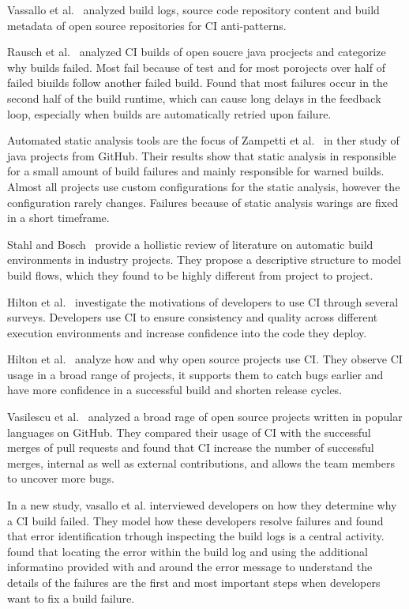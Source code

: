 \documentclass[\myrootdir/main.tex]{subfiles}
\begin{document}
Vassallo et al.~\cite{vassallo2019automated} analyzed build logs, source code repository content and build metadata of open source repositories for CI anti-patterns.

Rausch et al.~\cite{rausch2017empirical} analyzed CI builds of open soucre java procjects and categorize why builds failed.
Most fail because of test  and for most porojects over half of failed biuilds follow another failed build.
Found that most failures occur in the second half of the build runtime, which can cause long delays in the feedback loop, especially when builds are automatically retried upon failure.

Automated static analysis tools are the focus of Zampetti et al.~\cite{zampetti2017open} in ther study of java projects from GitHub.
Their results show that static analysis in responsible for a small amount of build failures and mainly responsible for warned builds.
Almost all projects use custom configurations for the static analysis, however the configuration rarely changes.
Failures because of static analysis warings are fixed in a short timeframe.

Stahl and Bosch~\cite{staahl2014modeling} provide a hollistic review of literature on automatic build environments in industry projects.
They propose a descriptive structure to model build flows, which they found to be highly different from project to project.

Hilton et al.~\cite{hilton2017trade-offs} investigate the motivations of developers to use CI through several surveys.
Developers use CI to ensure consistency and quality across different execution environments and increase confidence into the code they deploy.

Hilton et al.~\cite{hilton2016usage} analyze how and why open source projects use CI.
They observe CI usage in a broad range of projects, it supports them to catch bugs earlier and have more confidence in a successful build and shorten release cycles.

Vasilescu et al.~\cite{vasilescu2015quality} analyzed a broad rage of open source projects written in popular languages on GitHub.
They compared their usage of CI with the successful merges of pull requests and found that CI increase the number of successful merges, internal as well as external contributions, and allows the team members to uncover more bugs.



In a new study, vasallo et al. interviewed developers on how they determine why a CI build failed.
They model how these developers resolve failures and found that error identification trhough inspecting the build logs is a central activity. 
found that locating the error within the build log and using the additional informatino provided with and around the error message to understand the details of the failures are the first and most important steps when developers want to fix a build failure.
~\cite{vassallo2019every}
\end{document}
